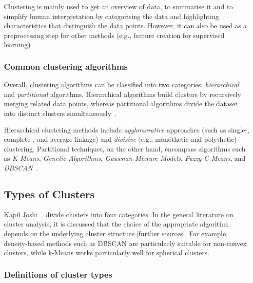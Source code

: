 \documentclass[10pt,twocolumn,letterpaper]{article}
\begin{document}
Clustering is mainly used to get an overview of data, to summarise it and to
simplify human interpretation by categorising the data and highlighting
characteristics that distinguish the data points. However, it can also be used
as a preprocessing step for other methods (e.g., feature creation for
supervised learning)~\cite{Jain2010651}.


\subsubsection{Common clustering algorithms}\label{subsubsec:common-clustering-algorithms}

Overall, clustering algorithms can be classified into two categories:
\textit{hierarchical} and \textit{partitional} algorithms. Hierarchical
algorithms build clusters by recursively merging related data points, whereas
partitional algorithms divide the dataset into distinct clusters
simultaneously~\cite{Ezugwu2022104743,Jain2010651}.

Hierarchical clustering methods include \textit{agglomerative} approaches (such
as single-, complete-, and average-linkage) and \textit{divisive} (e.g.,
monothetic and polythetic) clustering. Partitional techniques, on the other
hand, encompass algorithms such as \textit{K-Means}, \textit{Genetic
    Algorithms}, \textit{Gaussian Mixture Models}, \textit{Fuzzy C-Means}, and
\textit{DBSCAN}~\cite{Ezugwu2022104743}.


\subsection{Types of Clusters}\label{subsec:types-of-clusters}

Kapil Joshi \etal~\cite{Joshi2015} divide clusters into four categories.
In the general literature on cluster analysis, it is discussed that the choice
of the appropriate algorithm depends on the underlying cluster structure
    [further sources]. For example, density-based methods such as DBSCAN are
particularly suitable for non-convex clusters, while k-Means works particularly
well for spherical clusters.

\theoremstyle{definition}
\newtheorem{definition}{Definition}[subsubsection]

\subsubsection{Definitions of cluster types~\cite{Joshi2015}}
\end{document}
